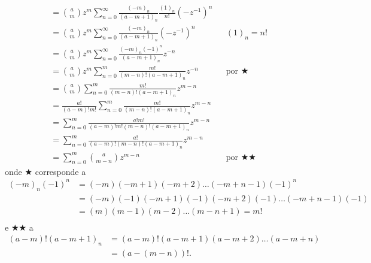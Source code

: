 \documentclass[a4paper,10pt, leqno, answers]{exam}  %
\begin{document}
\begin{questions}
\begin{parts}
\begin{solution}
\begin{align*}
                &= \binom{a}{m} z^m \sum_{n = 0}^\infty \frac{(-m)_n}{(a - m + 1)_n} \frac{(1)_n}{n!} (-z^{-1})^n \\
                &= \binom{a}{m} z^m \sum_{n = 0}^\infty \frac{(-m)_n}{(a - m + 1)_n} (-z^{-1})^n && (1)_n = n! \\
                &= \binom{a}{m} z^m \sum_{n = 0}^\infty \frac{(-m)_n (-1)^{n}}{(a - m + 1)_n} z^{-n} \\
                &= \binom{a}{m} z^m \sum_{n = 0}^m \frac{m!}{(m - n)! (a - m + 1)_n} z^{-n} && \text{por $\bigstar$} \\
                &= \binom{a}{m} \sum_{n = 0}^m \frac{m!}{(m - n)! (a - m + 1)_n} z^{m - n} \\
                &= \frac{a!}{(a - m)! m!} \sum_{n = 0}^m \frac{m!}{(m - n)! (a - m + 1)_n} z^{m - n} \\
                &= \sum_{n = 0}^m \frac{a! m!}{(a - m)! m! (m - n)! (a - m + 1)_n} z^{m - n} \\
                &= \sum_{n = 0}^m \frac{a!}{(a - m)! (m - n)! (a - m + 1)_n} z^{m - n} \\
                &= \sum_{n = 0}^m \binom{a}{m - n} z^{m - n} && \text{por $\bigstar\bigstar$}
            \end{align*}
            onde $\bigstar$ corresponde a
            \begin{align*}
                (-m)_n (-1)^n &= (-m) (-m + 1) (-m + 2) \ldots (-m + n - 1) (-1)^n \\
                &= (-m) (-1) (-m + 1) (-1) (-m + 2) (-1) \ldots (-m + n - 1) (-1) \\
                &= (m) (m - 1) (m - 2) \ldots (m - n + 1) = m! \\
            \end{align*}
            e $\bigstar\bigstar$ a
            \begin{align*}
                (a - m)! (a - m + 1)_n &= (a - m)! (a - m + 1) (a - m + 2) \ldots (a - m + n) \\
                &= (a - (m - n))!.
            \end{align*}
        \end{solution}


\end{parts}
\end{questions}
\end{document}
